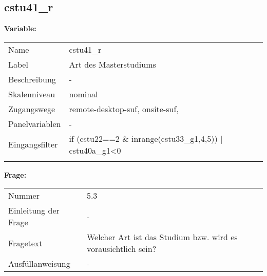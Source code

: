 	
	
	\subsection{cstu41\_r}
	\label{subSection:cstu41_r}

	\noindent\textbf{Variable:}\\
		\begin{tabular}{lL{11.3cm}}
			\label{tableVariable:cstu41_r}
			Name & cstu41\_r \\
			Label & Art des Masterstudiums \\
			Beschreibung & - \\
			Skalenniveau & nominal \\
			Zugangswege &
				remote-desktop-suf,
				onsite-suf,
 \\
			Panelvariablen & -
			 \\
			Eingangsfilter & if (cstu22==2 \& inrange(cstu33\_g1,4,5)) | cstu40a\_g1\textless{}0 \\
 \\
		\end{tabular}

		\vspace*{1 cm}
		\noindent\textbf{Frage:}\\
		\begin{tabular}{lL{11.3cm}}
			\label{tableQuestion:cstu41_r}
			Nummer & 5.3 \\
			Einleitung der Frage & - \\
			Fragetext & Welcher Art ist das Studium bzw. wird es vorausichtlich sein? \\
			Ausfüllanweisung & - \\
		\end{tabular}





